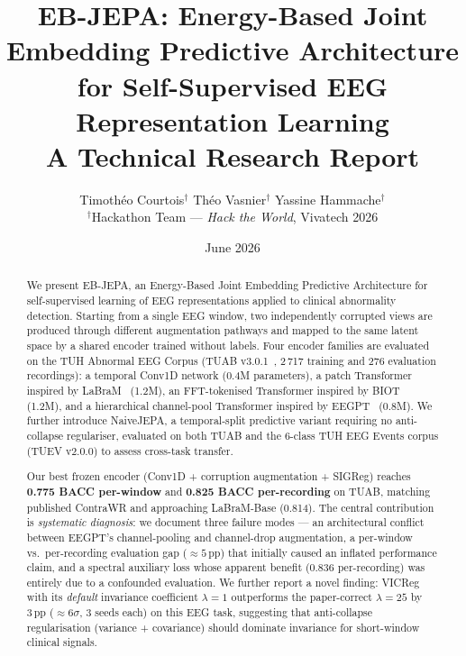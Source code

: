 \documentclass[11pt,a4paper]{article}
\title{\LARGE\bfseries EB-JEPA: Energy-Based Joint Embedding Predictive Architecture\\
for Self-Supervised EEG Representation Learning\\[4pt]
{\large A Technical Research Report}}
\author{
  Timoth\'eo Courtois$^{\dagger}$ \quad
  Th\'eo Vasnier$^{\dagger}$ \quad
  Yassine Hammache$^{\dagger}$\\[4pt]
  \small$^{\dagger}$Hackathon Team --- \textit{Hack the World}, Vivatech 2026
}
\date{June 2026}
\begin{document}
\maketitle

\begin{abstract}
We present EB-JEPA, an Energy-Based Joint Embedding Predictive Architecture
for self-supervised learning of EEG representations applied to clinical abnormality
detection.  Starting from a single EEG window, two independently corrupted views
are produced through different augmentation pathways and mapped to the same latent
space by a shared encoder trained without labels.  Four encoder families are evaluated
on the TUH Abnormal EEG Corpus (TUAB v3.0.1~\cite{tuab}, 2\,717 training and 276 evaluation
recordings): a temporal Conv1D network (0.4M parameters), a patch Transformer inspired
by LaBraM~\cite{labram} (1.2M), an FFT-tokenised Transformer inspired by BIOT~\cite{biot}
(1.2M), and a hierarchical channel-pool Transformer inspired by EEGPT~\cite{eegpt} (0.8M).
We further introduce NaiveJEPA, a temporal-split predictive variant requiring no
anti-collapse regulariser, evaluated on both TUAB and the 6-class TUH EEG Events corpus
(TUEV v2.0.0) to assess cross-task transfer.

Our best frozen encoder (Conv1D + corruption augmentation + SIGReg) reaches
\textbf{0.775 BACC per-window} and \textbf{0.825 BACC per-recording} on TUAB,
matching published ContraWR and approaching LaBraM-Base (0.814).
The central contribution is \emph{systematic diagnosis}: we document three failure
modes --- an architectural conflict between EEGPT's channel-pooling and channel-drop
augmentation, a per-window vs.\ per-recording evaluation gap (${\approx}5$\,pp) that
initially caused an inflated performance claim, and a spectral auxiliary loss whose
apparent benefit (0.836 per-recording) was entirely due to a confounded evaluation.
We further report a novel finding: VICReg with its \emph{default} invariance coefficient
$\lambda{=}1$ outperforms the paper-correct $\lambda{=}25$ by $3\,\text{pp}$ (${\approx}6\sigma$,
3 seeds each) on this EEG task, suggesting that anti-collapse regularisation (variance +
covariance) should dominate invariance for short-window clinical signals.
\end{abstract}

\tableofcontents
\newpage

\end{document}

